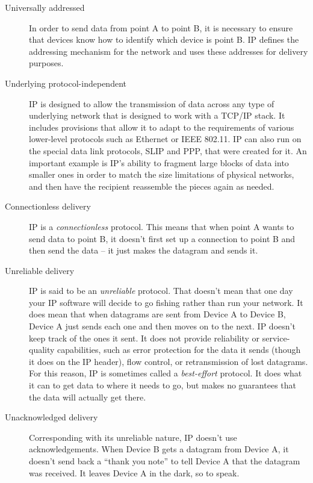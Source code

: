 \begin{description}
   \item[Universally addressed]
      In order to send data from point A to point B, it is necessary to ensure that devices know how to identify which device is point B.
      IP defines the addressing mechanism for the network and uses these addresses for delivery purposes.

   \item[Underlying protocol-independent]
      IP is designed to allow the transmission of data across any type of underlying network that is designed to work with a TCP/IP stack.
      It includes provisions that allow it to adapt to the requirements of various lower-level protocols such as Ethernet or IEEE 802.11.
      IP can also run on the special data link protocols, SLIP and PPP, that were created for it.
      An important example is IP's ability to fragment large blocks of data into smaller ones in order to match the size limitations of physical networks, and then have the recipient reassemble the pieces again as needed.

   \item[Connectionless delivery]
      IP is a \emph{connectionless} protocol.
      This means that when point A wants to send data to point B, it doesn't first set up a connection to point B and then send the data -- it just makes the datagram and sends it.

   \item[Unreliable delivery]
      IP is said to be an \emph{unreliable} protocol.
      That doesn't mean that one day your IP software will decide to go fishing rather than run your network.
      It does mean that when datagrams are sent from Device A to Device B, Device A just sends each one and then moves on to the next.
      IP doesn't keep track of the ones it sent.
      It does not provide reliability or service-quality capabilities, such as error protection for the data it sends (though it does on the IP header), flow control, or retransmission of lost datagrams.
      For this reason, IP is sometimes called a {\emph{best-effort}} protocol.
      It does what it can to get data to where it needs to go, but makes no guarantees that the data will actually get there.

   \item[Unacknowledged delivery]
      Corresponding with its unreliable nature, IP doesn't use acknowledgements.
      When Device B gets a datagram from Device A, it doesn't send back a ``thank you note'' to tell Device A that the datagram was received.
      It leaves Device A in the dark, so to speak.
\end{description}

